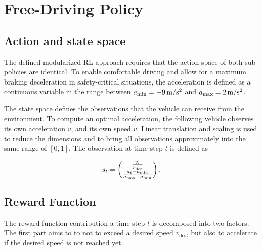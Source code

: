 \documentclass[review]{elsarticle}
\providecommand{\green}[1]{\textcolor{green}{#1}}
\providecommand{\martinc}[1]{\green{[#1]}} %
\providecommand{\sub}[1]{_{\mathrm{#1}}}  %
\providecommand{\3}{{\ss}}
\begin{document}
  
  



\section{Free-Driving Policy}
\label{sec:FreeDrivingPolicy}
\subsection{Action and state space}
\label{actionSpace1}
 The defined modularized RL approach requires that the action space of both sub-policies are identical. To enable comfortable driving and allow for a maximum braking deceleration in safety-critical
situations, the acceleration is defined as a continuous variable in the
  range between $a\sub{\rm min} = \unit[-9]{m/s^2}$ and $a\sub{\rm max} =\unit[2]{m/s^2}$.



The state space defines the observations that the 
vehicle can receive from the environment. To compute an optimal
acceleration, the following vehicle observes its own acceleration $\dot{v}$,
and its own speed $v$. Linear translation and scaling is used to
reduce the dimensions and to bring all observations approximately into
the same range of $[0,1]$. The observation at time step $t$ is defined
as 

\begin{equation}
s_t = \begin{pmatrix} \frac{v_t}{v\sub{des}} \\ \frac{a_t-a\sub{\rm min}}{a\sub{\rm max} - a\sub{\rm min}}\end{pmatrix}.
\end{equation}
\subsection{Reward Function}
\label{rewardFunction}
The reward function contribution a time step $t$ is decomposed into two factors. The first part aims to
to not to exceed a desired speed $v\sub{des}$, but also to accelerate if the desired speed is not reached yet.  
\end{document}
